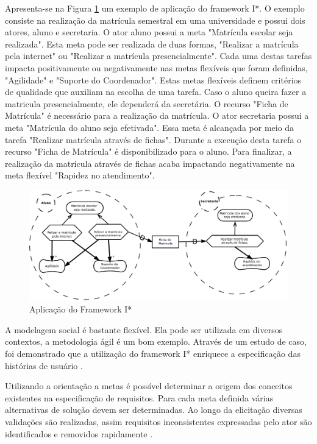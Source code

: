 Apresenta-se na Figura \ref{exemplo-istar} um exemplo de aplicação do framework I*. O exemplo consiste na realização da matrícula semestral em uma universidade e possui dois atores, aluno e secretaria. O ator aluno possui a meta "Matrícula escolar seja realizada". Esta meta pode ser realizada de duas formas, "Realizar a matrícula pela internet" ou "Realizar a matrícula presencialmente". Cada uma destas tarefas impacta positivamente ou negativamente nas metas flexíveis que foram definidas, "Agilidade" e "Suporte do Coordenador". Estas metas flexíveis definem critérios de qualidade que auxiliam na escolha de uma tarefa. Caso o aluno queira fazer a matricula presencialmente, ele dependerá da secretária. O recurso "Ficha de Matrícula" é necessário para a realização da matrícula. O ator secretaria possui a meta "Matrícula do aluno seja efetivada". Essa meta é alcançada	 por meio da tarefa "Realizar matrícula através de fichas". Durante a execução desta tarefa o recurso "Ficha de Matrícula" é disponibilizado para o aluno. Para finalizar, a realização da matrícula através de fichas acaba impactando negativamente na meta flexível "Rapidez no atendimento".

\graphicspath{{figuras/}}
\begin{figure}[H]
\centering
\includegraphics[width=1.1\textwidth]{exemplo-istar}
\caption{Aplicação do Framework I*} 
\label{exemplo-istar}
\end{figure}
 
A modelagem social é bastante flexível. Ela pode ser utilizada em diversos contextos, a metodologia ágil é um bom exemplo. Através de um estudo de caso, foi demonstrado que a utilização do framework I* enriquece a especificação das histórias de usuário \cite{jaqueira_2013}.

Utilizando a orientação a metas é possível determinar a origem dos conceitos existentes na especificação de requisitos. Para cada meta definida várias alternativas de solução devem ser determinadas. Ao longo da elicitação diversas validações são realizadas, assim requisitos inconsistentes expressadas pelo ator são identificados e removidos rapidamente \cite{zdra2013}.


